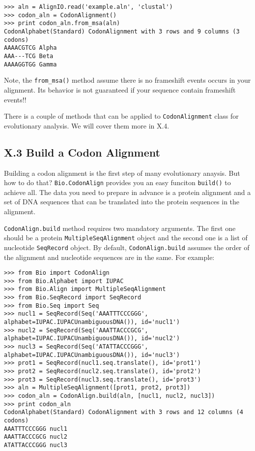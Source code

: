 \documentclass{article}
\begin{document}
\begin{verbatim}
>>> aln = AlignIO.read('example.aln', 'clustal')
>>> codon_aln = CodonAlignment()
>>> print codon_aln.from_msa(aln)
CodonAlphabet(Standard) CodonAlignment with 3 rows and 9 columns (3 codons)
AAAACGTCG Alpha
AAA---TCG Beta
AAAAGGTGG Gamma
\end{verbatim}

Note, the \texttt{from\_msa()} method assume there is no frameshift
events occurs in your alignment. Its behavior is not guaranteed if your
sequence contain frameshift events!!

There is a couple of methods that can be applied to
\texttt{CodonAlignment} class for evolutionary analysis. We will cover
them more in X.4.

\subsection{X.3 Build a Codon Alignment}

Building a codon alignment is the first step of many evolutionary
anaysis. But how to do that? \texttt{Bio.CodonAlign} provides you an
easy funciton \texttt{build()} to achieve all. The data you need to
prepare in advance is a protein alignment and a set of DNA sequences
that can be translated into the protein sequences in the alignment.

\texttt{CodonAlign.build} method requires two mandatory arguments. The
first one should be a protein \texttt{MultipleSeqAlignment} object and
the second one is a list of nucleotide \texttt{SeqRecord} object. By
default, \texttt{CodonAlign.build} assumes the order of the alignment
and nucleotide sequences are in the same. For example:

\begin{verbatim}
>>> from Bio import CodonAlign
>>> from Bio.Alphabet import IUPAC
>>> from Bio.Align import MultipleSeqAlignment
>>> from Bio.SeqRecord import SeqRecord
>>> from Bio.Seq import Seq
>>> nucl1 = SeqRecord(Seq('AAATTTCCCGGG', alphabet=IUPAC.IUPACUnambiguousDNA()), id='nucl1')
>>> nucl2 = SeqRecord(Seq('AAATTACCCGCG', alphabet=IUPAC.IUPACUnambiguousDNA()), id='nucl2')
>>> nucl3 = SeqRecord(Seq('ATATTACCCGGG', alphabet=IUPAC.IUPACUnambiguousDNA()), id='nucl3')
>>> prot1 = SeqRecord(nucl1.seq.translate(), id='prot1')
>>> prot2 = SeqRecord(nucl2.seq.translate(), id='prot2')
>>> prot3 = SeqRecord(nucl3.seq.translate(), id='prot3')
>>> aln = MultipleSeqAlignment([prot1, prot2, prot3])
>>> codon_aln = CodonAlign.build(aln, [nucl1, nucl2, nucl3])
>>> print codon_aln
CodonAlphabet(Standard) CodonAlignment with 3 rows and 12 columns (4 codons)
AAATTTCCCGGG nucl1
AAATTACCCGCG nucl2
ATATTACCCGGG nucl3
\end{verbatim}
\end{document}
